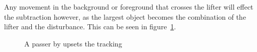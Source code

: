 Any movement in the background or foreground that crosses the lifter will effect the subtraction however, as the largest object becomes the combination of the lifter and the disturbance. This can be seen in figure~\ref{fig:badtracking}.

\begin{figure}[H]
    \centering
\caption{A passer by upsets the tracking}
\label{fig:badtracking}
\end{figure}

